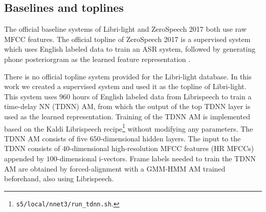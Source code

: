 \documentclass[transmag]{IEEEtran}
\begin{document}

\subsection{Baselines and toplines}
\label{subsec:exp_setup_baseline_topline}
The official baseline systems of Libri-light and ZeroSpeech 2017   \cite{kahn2019librilight,dunbar2017zero} both use raw MFCC features.  
The official topline of ZeroSpeech 2017 is a supervised system which uses English labeled data to train an ASR system, followed by generating phone posteriorgram as the learned feature representation \cite{dunbar2017zero}.

There is no official topline system provided for the Libri-light database. In this work we created a supervised system and used it as the topline of Libri-light. This system uses 960 hours of English labeled data from Librispeech \cite{panayotov2015librispeech} to train a time-delay NN (TDNN) AM, from which the output of the top TDNN layer is used as the learned representation. 
Training of the TDNN AM is implemented based on the Kaldi Librispeech recipe\footnote{\texttt{s5/local/nnet3/run\_tdnn.sh}.} without modifying any parameters. The TDNN AM consists of five $650$-dimensional hidden layers.
The input to the TDNN consists of $40$-dimensional high-resolution MFCC features (HR MFCCs) appended by $100$-dimensional i-vectors. Frame labels needed to train the TDNN AM are obtained by forced-alignment with a GMM-HMM AM trained beforehand, also using Librispeech.

\end{document}
